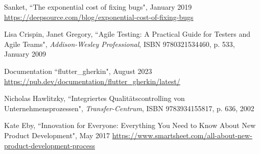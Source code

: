 \begin{thebibliography}{100}

 Sanket, ``The exponential cost of fixing bugs", January 2019\\
\href{https://deepsource.com/blog/exponential-cost-of-fixing-bugs}{https://deepsource.com/blog/exponential-cost-of-fixing-bugs}

 Lisa Crispin, Janet Gregory, ``Agile Testing: A Practical Guide for Testers and Agile 
Teams", \emph{Addison-Wesley Professional}, ISBN 9780321534460, p. 533, January 2009

 Documentation ``flutter\_gherkin", August 2023\\
\href{https://pub.dev/documentation/flutter_gherkin/latest/}{https://pub.dev/documentation/flutter\_gherkin/latest/}

 Nicholas Hawlitzky, ``Integriertes Qualitätscontrolling von Unternehmensprozessen",
\emph{Transfer-Centrum}, ISBN 9783934155817, p. 636, 2002

 Kate Eby, ``Innovation for Everyone: Everything You Need to Know About New Product 
Development", May 2017
\href{https://www.smartsheet.com/all-about-new-product-development-process}{https://www.smartsheet.com/all-about-new-product-development-process}

\end{thebibliography}
